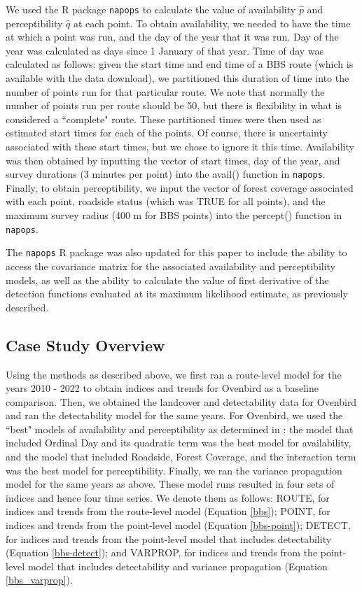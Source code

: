 \par We used the R package \texttt{napops} \citep{edwards_napops_2024} to calculate the value of availability $\hat{p}$ and perceptibility $\hat{q}$ at each point.
To obtain availability, we needed to have the time at which a point was run, and the day of the year that it was run.
Day of the year was calculated as days since 1 January of that year.
Time of day was calculated as follows: given the start time and end time of a BBS route (which is available with the data download), we partitioned this duration of time into the number of points run for that particular route.
We note that normally the number of points run per route should be 50, but there is flexibility in what is considered a ``complete" route.
These partitioned times were then used as estimated start times for each of the points. 
Of course, there is uncertainty associated with these start times, but we chose to ignore it this time.
Availability was then obtained by inputting the vector of start times, day of the year, and survey durations (3 minutes per point) into the avail() function in \texttt{napops}.
Finally, to obtain perceptibility, we input the vector of forest coverage associated with each point, roadside status (which was TRUE for all points), and the maximum survey radius (400 m for BBS points) into the percept() function in \texttt{napops}.

\par The \texttt{napops} R package was also updated for this paper to include the ability to access the covariance matrix for the associated availability and perceptibility models, as well as the ability to calculate the value of first derivative of the detection functions evaluated at its maximum likelihood estimate, as previously described.

\subsection{Case Study Overview}

Using the methods as described above, we first ran a route-level model for the years 2010 - 2022 to obtain indices and trends for Ovenbird as a baseline comparison.
Then, we obtained the landcover and detectability data for Ovenbird and ran the detectability model for the same years.
For Ovenbird, we used the ``best" models of availability and perceptibility as determined in \citet{edwards_point_2023}: the model that included Ordinal Day and its quadratic term was the best model for availability, and the model that included Roadside, Forest Coverage, and the interaction term was the best model for perceptibility.
Finally, we ran the variance propagation model for the same years as above.
These model runs resulted in four sets of indices and hence four time series.
We denote them as follows: ROUTE, for indices and trends from the route-level model (Equation \ref{bbs}); POINT, for indices and trends from the point-level model (Equation \ref{bbs-point}); DETECT, for indices and trends from the point-level model that includes detectability (Equation \ref{bbs-detect}); and VARPROP, for indices and trends from the point-level model that includes detectability and variance propagation (Equation \ref{bbs_varprop}).

